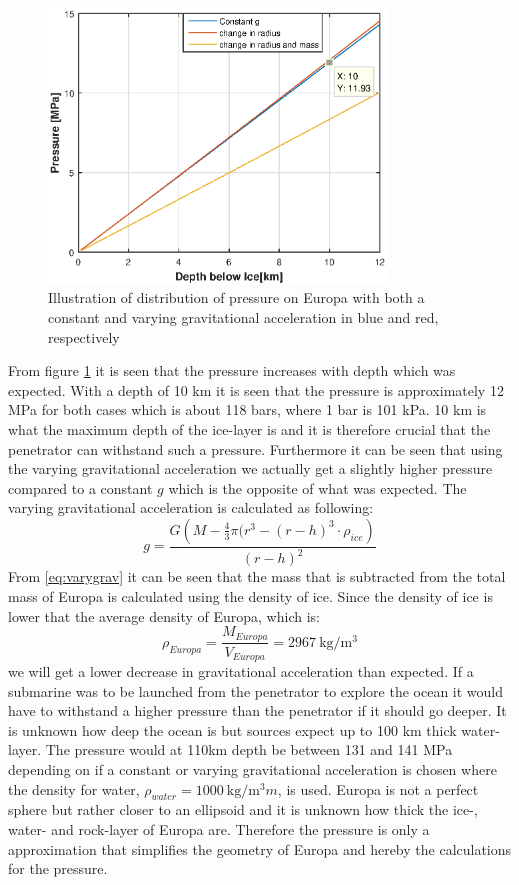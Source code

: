 \begin{figure}[htb]
  \centering
  \includegraphics[width=0.8\textwidth]{figures/Ricardo/pressure.eps}
  \caption{Illustration of distribution of pressure on Europa with both a constant and varying gravitational acceleration in blue and red, respectively}
  \label{fig:Pressure}
\end{figure}
From figure \ref{fig:Pressure} it is seen that the pressure increases with depth which was expected. With a depth of 10 km it is seen that the pressure is approximately 12 MPa for both cases which is about 118 bars, where 1 bar is 101 kPa. 10 km is what the maximum depth of the ice-layer is and it is therefore crucial that the penetrator can withstand such a pressure. Furthermore it can be seen that using the varying gravitational acceleration we actually get a slightly higher pressure compared to a constant $g$ which is the opposite of what was expected. The varying gravitational acceleration is calculated as following: 
\begin{equation}\label{eq:varygrav}
g = \frac{G \left(M - \frac{4}{3} \pi (r^3-(r-h)^3 \cdot \rho _{ice}\right)}{(r-h)^2}
\end{equation}
From \ref{eq:varygrav} it can be seen that the mass that is subtracted from the total mass of Europa is calculated using the density of ice. Since the density of ice is lower that the average density of Europa, which is:
\begin{equation}
\rho_{Europa} = \frac{M_{Europa}}{V_{Europa}} = \SI{2967}{\kg\per\m^3}
\end{equation}
we will get a lower decrease in gravitational acceleration than expected. If a submarine was to be launched from the penetrator to explore the ocean it would have to withstand a higher pressure than the penetrator if it should go deeper. It is unknown how deep the ocean is but sources expect up to 100 km thick water-layer. The pressure would at 110km depth be between 131 and 141 MPa depending on if a constant or varying gravitational acceleration is chosen where the density for water, $\rho_{water} = \SI{1000}{\kg\per\m^3}m$, is used. Europa is not a perfect sphere but rather closer to an ellipsoid and it is unknown how thick the ice-, water- and rock-layer of Europa are. Therefore the pressure is only a approximation that simplifies the geometry of Europa and hereby the calculations for the pressure. 



